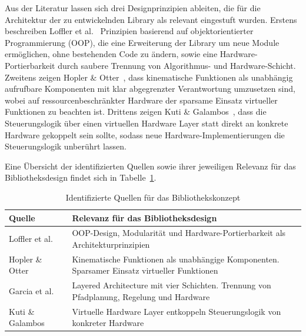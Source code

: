 \documentclass[12pt,a4paper]{article}
\begin{document}
Aus der Literatur lassen sich drei Designprinzipien ableiten, die für die Architektur der zu entwickelnden Library als relevant eingestuft wurden. Erstens beschreiben Loffler et al.~\cite{MarkusS.LofflerDarrenM.DawsonErkanZergerogluandNicolaeP.Costescu.} Prinzipien basierend auf objektorientierter Programmierung (OOP), die eine Erweiterung der Library um neue Module ermöglichen, ohne bestehenden Code zu ändern, sowie eine Hardware-Portierbarkeit durch saubere Trennung von Algorithmus- und Hardware-Schicht. Zweitens zeigen Hopler \& Otter~\cite{RobertHopler.2001}, dass kinematische Funktionen als unabhängig aufrufbare Komponenten mit klar abgegrenzter Verantwortung umzusetzen sind, wobei auf ressourcenbeschränkter Hardware der
sparsame Einsatz virtueller Funktionen zu beachten ist. Drittens zeigen Kuti \& Galambos~\cite{JozsefKuti.2023}, dass die Steuerungslogik über einen virtuellen Hardware Layer statt direkt an konkrete Hardware gekoppelt sein sollte, sodass neue Hardware-Implementierungen die Steuerungslogik unberührt lassen.

Eine Übersicht der identifizierten Quellen sowie ihrer jeweiligen Relevanz für das Bibliotheksdesign findet sich in Tabelle~\ref{tab:architektur-quellen}.

\begin{table}[H]
\centering
\caption{Identifizierte Quellen für das Bibliothekskonzept}
\label{tab:architektur-quellen}
\begin{tabularx}{\textwidth}{p{4.5cm} X}
\toprule
\textbf{Quelle} & \textbf{Relevanz für das Bibliotheksdesign} \\
\midrule
Loffler et al.~\cite{MarkusS.LofflerDarrenM.DawsonErkanZergerogluandNicolaeP.Costescu.}
  & OOP-Design, Modularität und Hardware-Portierbarkeit als Architekturprinzipien \\
\addlinespace
Hopler \& Otter~\cite{RobertHopler.2001}
  & Kinematische Funktionen als unabhängige Komponenten. Sparsamer Einsatz virtueller Funktionen \\
\addlinespace
Garcia et al.~\cite{J.GaimezGarciaJ.GomezOrtegaL.NietoNietoandA.SanchezGarcia.2007}
  & Layered Architecture mit vier Schichten. Trennung von Pfadplanung, Regelung und Hardware \\
\addlinespace
Kuti \& Galambos~\cite{JozsefKuti.2023}
  & Virtuelle Hardware Layer entkoppeln Steuerungslogik von konkreter Hardware \\
\bottomrule
\end{tabularx}
\end{table}
\end{document}
